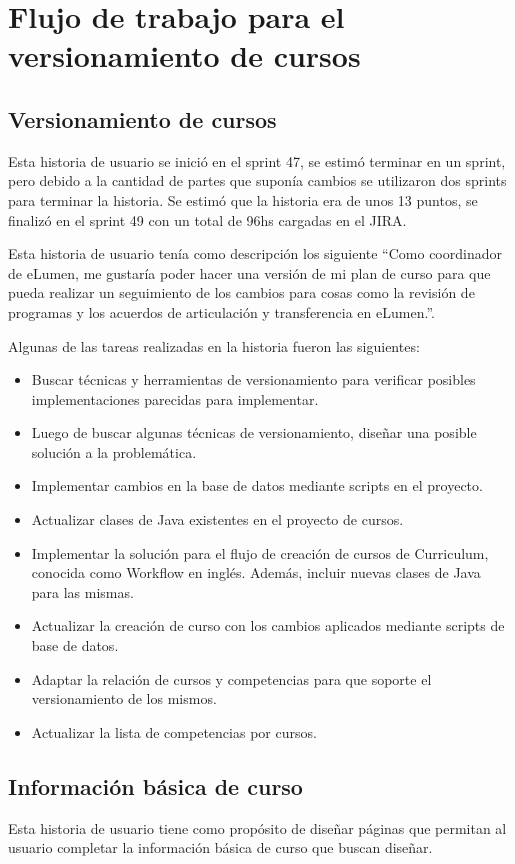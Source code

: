 \section{Flujo de trabajo para el versionamiento de cursos}
\subsection{Versionamiento de cursos}
Esta historia de usuario se inició en el sprint 47, se estimó terminar en un sprint, pero debido a la cantidad de partes que suponía cambios se utilizaron dos sprints para terminar la historia. Se estimó que la historia era de unos 13 puntos, se finalizó en el sprint 49 con un total de 96hs cargadas en el JIRA.

Esta historia de usuario tenía como descripción los siguiente “Como coordinador de eLumen, me gustaría poder hacer una versión de mi plan de curso para que pueda realizar un seguimiento de los cambios para cosas como la revisión de programas y los acuerdos de articulación y transferencia en eLumen.”.

Algunas de las tareas realizadas en la historia fueron las siguientes:

\begin{itemize}
	\item Buscar técnicas y herramientas de versionamiento para verificar posibles implementaciones parecidas para implementar.
	\item Luego de buscar algunas técnicas de versionamiento, diseñar una posible solución a la problemática.
	\item Implementar cambios en la base de datos mediante scripts en el proyecto.
	\item Actualizar clases de Java existentes en el proyecto de cursos.
	\item Implementar la solución para el flujo de creación de cursos de Curriculum, conocida como Workflow en inglés. Además, incluir nuevas clases de Java para las mismas.
	\item Actualizar la creación de curso con los cambios aplicados mediante scripts de base de datos.
	\item Adaptar la relación de cursos y competencias para que soporte el versionamiento de los mismos.
	\item Actualizar la lista de competencias por cursos.
\end{itemize}

\subsection{Información básica de curso}
Esta historia de usuario tiene como propósito de diseñar páginas que permitan al usuario completar la información básica de curso que buscan diseñar.

